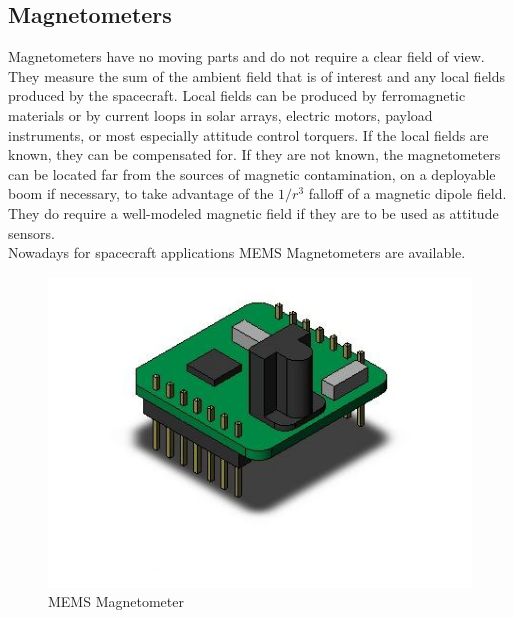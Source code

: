 \documentclass[11pt,a4paper]{report}
\begin{document}
\subsection{Magnetometers}
Magnetometers have no moving parts and do not require a clear field of view.
They measure the sum of the ambient field that is of interest and
any local fields produced by the spacecraft. Local fields can be produced by
ferromagnetic materials or by current loops in solar arrays, electric motors, payload instruments, or most especially attitude control torquers. If the local fields are known, they can be compensated for. If they are not known, the magnetometers can be located far from the sources of magnetic contamination, on a deployable boom if necessary, to take advantage of the $1/r^3$ falloff of a magnetic dipole field. \\
They do require a well-modeled magnetic field if they are to be used as attitude sensors.\\
Nowadays for spacecraft applications MEMS Magnetometers are available.\\

\begin{figure}[H]
 	\centering
 	\includegraphics[scale=1]{gfx/magnetometer.jpg}
    \caption{MEMS Magnetometer}
\end{figure}
\end{document}

